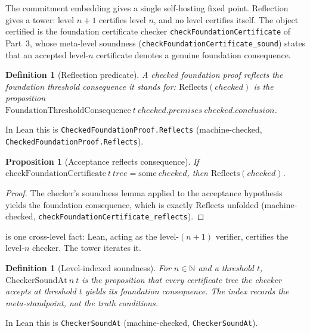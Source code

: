 \documentclass[11pt,a4paper]{article}
\newtheorem{proposition}[theorem]{Proposition}
\newtheorem{definition}[theorem]{Definition}
\newcommand{\Nat}{\mathbb{N}}
\begin{document}
The commitment embedding gives a single self-hosting fixed point.
Reflection gives a tower: level $n+1$ certifies level $n$, and no level
certifies itself.
The object certified is the foundation certificate checker
\texttt{checkFoundationCertificate} of Part~3, whose meta-level soundness
(\texttt{checkFoundationCertificate\_sound}) states that an accepted level-$n$
certificate denotes a genuine foundation consequence.

\begin{definition}[Reflection predicate]
\label{def:reflects}
A checked foundation proof \emph{reflects} the foundation threshold consequence
it stands for: $\mathrm{Reflects}(\mathit{checked})$ is the proposition
$\mathrm{FoundationThresholdConsequence}\ t\ \mathit{checked.premises}\
\mathit{checked.conclusion}$.
\end{definition}

In Lean this is \texttt{CheckedFoundationProof.Reflects}
(machine-checked, \texttt{CheckedFoundationProof.Reflects}).

\begin{proposition}[Acceptance reflects consequence]
\label{prop:reflects}
If $\mathrm{checkFoundationCertificate}\ t\ \mathit{tree} =
\mathrm{some}\ \mathit{checked}$, then $\mathrm{Reflects}(\mathit{checked})$.
\end{proposition}

\begin{proof}
The checker's soundness lemma applied to the acceptance hypothesis yields the
foundation consequence, which is exactly $\mathrm{Reflects}$ unfolded
(machine-checked, \texttt{checkFoundationCertificate\_reflects}).
\end{proof}

 is one cross-level fact: Lean, acting as the level-$(n+1)$
verifier, certifies the level-$n$ checker.
The tower iterates it.

\begin{definition}[Level-indexed soundness]
\label{def:soundat}
For $n \in \Nat$ and a threshold $t$, $\mathrm{CheckerSoundAt}\ n\ t$ is the
proposition that every certificate tree the checker accepts at threshold $t$
yields its foundation consequence.
The index records the meta-standpoint, not the truth conditions.
\end{definition}

In Lean this is \texttt{CheckerSoundAt}
(machine-checked, \texttt{CheckerSoundAt}).
\end{document}
